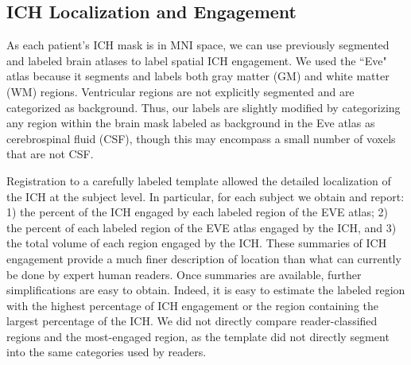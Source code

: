 \documentclass[10pt]{article}\usepackage[]{graphicx}\usepackage[]{color}
\begin{document}
\subsection{ICH Localization and Engagement}
\label{sec:engage}
As each patient's ICH mask is in MNI space, we can use previously segmented and labeled brain atlases to label spatial ICH engagement.  
We used the ``Eve" atlas \citep{oishi_human_2008} because it segments and labels both gray matter (GM) and white matter (WM) regions.  Ventricular regions are not explicitly segmented and are categorized as background.  Thus, our labels are slightly modified by categorizing any region within the brain mask labeled as background in the Eve atlas as cerebrospinal fluid (CSF), though this may encompass a small number of voxels that are not CSF.  

Registration to a carefully labeled template allowed the detailed localization of the ICH at the subject level. In particular, for each subject we obtain and report: 1) the percent of the ICH engaged by each labeled region of the EVE atlas; 2) the percent of each labeled region of the EVE atlas engaged by the ICH, and 3) the total volume of each region engaged by the ICH. 
These summaries of ICH engagement provide a much finer description of location than what can currently be done by expert human readers.  Once summaries are available, further simplifications are easy to obtain. Indeed, it is easy to estimate the labeled region with the highest percentage of ICH engagement or the region containing the largest percentage of the ICH. We did not directly compare reader-classified regions and the most-engaged region, as the template did not directly segment into the same categories used by readers.
\end{document}
